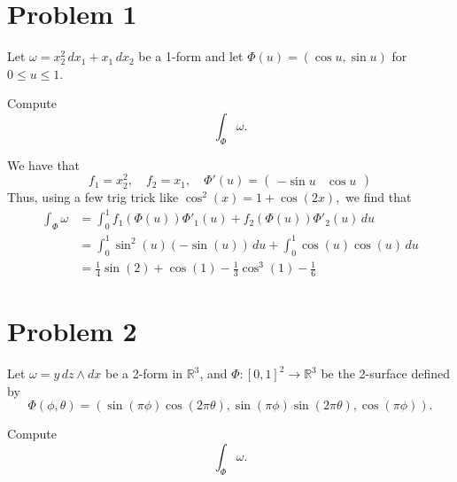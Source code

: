 \documentclass[11pt]{article}
\begin{document}
	
	
	\psetheader


\section*{Problem 1}
Let \(\omega = x_2^2\,dx_1 + x_1\,dx_2\) be a 1-form and let \(\Phi(u) = (\cos u, \sin u)\) for \(0 \leq u \leq 1\).

Compute
\[
\int_{\Phi} \omega.
\]

\begin{solution}
We have that 
\[f_1 = x_2^2, \quad f_2= x_1, \quad \Phi'(u) = \begin{pmatrix}
        -\sin u & \cos u
    \end{pmatrix}\]
    Thus, using a few trig trick like $\cos^2(x) = 1 + \cos(2x),$ we find that
    \begin{align*}
        \int_\Phi \omega &= \int_0^1 f_1(\Phi(u))\Phi'_1(u) + f_2(\Phi(u))\Phi'_2(u)\, du\\
        &=\int_0^1 \sin^2(u)(-\sin (u))\, du + \int_0^1\cos (u) \cos(u)\, du\\
        &= \frac{1}{4}\sin(2) + \cos(1) - \frac{1}{3} \cos^3(1) - \frac{1}{6}
    \end{align*}


\end{solution}

\newpage
\section*{Problem 2}
Let \(\omega = y\,dz \wedge dx\) be a 2-form in \(\mathbb{R}^3\), and \(\Phi : [0, 1]^2 \to \mathbb{R}^3\) be the 2-surface defined by
\[
\Phi(\phi, \theta) = (\sin(\pi\phi) \cos(2\pi\theta), \sin(\pi\phi) \sin(2\pi\theta), \cos(\pi\phi)).
\]

Compute
\[
\int_{\Phi} \omega.
\]
\end{document}
